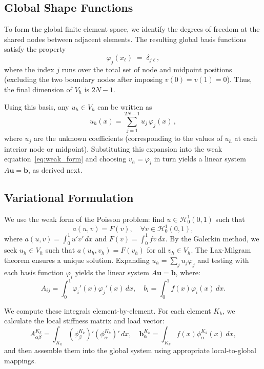 \documentclass[a4paper,10pt]{article}
\begin{document}
\subsection{Global Shape Functions}
To form the global finite element space, we identify the degrees of freedom at the shared nodes between adjacent elements.
The resulting global basis functions satisfy the property
\[
	\varphi_j(x_\ell) \;=\; \delta_{j\ell},
\]
where the index $j$ runs over the total set of node and midpoint positions (excluding the two boundary nodes after imposing $v(0)=v(1)=0$). Thus, the final dimension of $V_h$ is $2N-1$.

Using this basis, any \(u_h \in V_h\) can be written as
\[
	u_h(x) = \sum_{j=1}^{2N-1} u_j\,\varphi_j(x)\,,
\]
where \(u_j\) are the unknown coefficients (corresponding to the values of \(u_h\) at each interior node or midpoint).
Substituting this expansion into the weak equation~\eqref{eq:weak_form} and choosing \(v_h=\varphi_i\) in turn yields a linear system \(A \mathbf{u} = \mathbf{b}\), as derived next.

\subsection{Variational Formulation}
We use the weak form of the Poisson problem: find $u \in \mathcal{H}^1_0(0,1)$ such that
\[
	a(u,v) = F(v), \quad \forall v \in \mathcal{H}^1_0(0,1),
\]
where $a(u,v) = \int_0^1 u'v'\,dx$ and $F(v) = \int_0^1 fv\,dx$. By the Galerkin method, we seek $u_h \in V_h$ such that $a(u_h,v_h) = F(v_h)$ for all $v_h \in V_h$. 
The Lax-Milgram theorem ensures a unique solution.
Expanding $u_h = \sum_j u_j\varphi_j$ and testing with each basis function $\varphi_i$ yields the linear system $A\mathbf{u} = \mathbf{b}$, where:
\[
	A_{ij} = \int_{0}^{1} \varphi_i'(x)\varphi_j'(x)\,dx, \quad 
	b_i = \int_{0}^{1} f(x)\varphi_i(x)\,dx.
\]

We compute these integrals element-by-element. For each element $K_k$, we calculate the local stiffness matrix and load vector:
\[
	A^{K_k}_{\alpha\beta} = \int_{K_k} (\phi_{\beta}^{K_k})' (\phi_{\alpha}^{K_k})'\,dx, \quad
	\mathbf{b}^{K_k}_\alpha = \int_{K_k} f(x)\phi_{\alpha}^{K_k}(x)\,dx,
\]
and then assemble them into the global system using appropriate local-to-global mappings.
\end{document}
